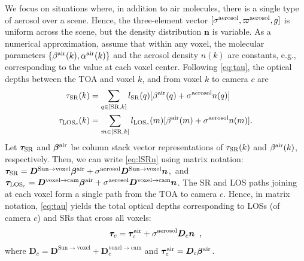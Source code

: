 \documentclass[10pt,letterpaper]{article}
\newcommand{\vect}[1]{\bm{#1}}
\newcommand{\OpDistance}{\bm{D}}
\newcommand{\DistUnknown}{\vect{n}}
\begin{document}
We focus on situations where, in addition to air molecules, there is a
single type of aerosol over a scene. Hence, the three-element vector
$[{\sigma}^{\rm aerosol},\varpi^{\rm aerosol},g]$ is uniform across
the scene, but the density distribution ${\DistUnknown}$ is
variable. As a numerical approximation, assume that within any voxel,
the molecular parameters $\{ \beta^{\rm air}(k),\alpha^{\rm air}(k)\}$
and the aerosol density $n(k)$ are constants, e.g., corresponding to
the value at each voxel center.  Following \cref{eq:tau}, the optical
depths between the TOA and voxel $k$, and from voxel $k$ to camera $c$ are
\begin{align}
  \tau_{\rm SR}(k)&=
  \sum_{q \in[{\rm SR},k]} l_{\rm SR}(q)
  [\beta^{\rm air}(q)+\sigma^{\rm aerosol} n(q)] \\
  \tau_{{\rm LOS}_c}(k)&=
  \sum_{m \in[{\rm SR},k]} l_{{\rm LOS}_c}(m)
  [\beta^{\rm air}(m)+\sigma^{\rm aerosol} n(m)].
  \label{eq:lSRn}
\end{align}
Let $\vect{\tau}_{\rm SR}$ and $\vect{\beta}^{\rm air}$ be 
column stack vector
representations of $\tau_{\rm SR}(k)$ and $\beta^{\rm air}(k)$, respectively.
 Then, we can write \cref{eq:lSRn} using
matrix notation: 
   \mbox{$\vect{\tau}_{\rm SR}=
   \OpDistance^{\mathrm{Sun \rightarrow voxel}}\vect{\beta}^{\rm air} 
   + \sigma^{\rm aerosol}\OpDistance^{\mathrm{Sun \rightarrow voxel}} {\DistUnknown}$},\
and
    \mbox{$\vect{\tau}_{{\rm LOS}_c}=
   \OpDistance^{\mathrm{voxel \rightarrow cam}}\vect{\beta}^{\rm air}
   + \sigma^{\rm aerosol}\OpDistance^{\mathrm{voxel \rightarrow cam}} {\DistUnknown}$}.
The SR and LOS paths joining at each voxel 
form a single path from the TOA to camera $c$.  
Hence, in matrix notation, \cref{eq:tau} yields the total optical
depths corresponding to LOSs (of camera $c$) and SRs that cross all
voxels:
\begin{equation}
  \vect{\tau}_c= \vect{\tau}_c^{\rm air}
  + \sigma^{\rm aerosol} {\bm D}_c {\bm n}
  \;\;,
  \label{eq:tautotal}
\end{equation}
where   ${\bm D}_c=
  {\bm D}^{\mathrm{Sun \rightarrow voxel}}+
  {\bm D}^{\mathrm{voxel \rightarrow cam}}_c$
and $\vect{\tau}_c^{\rm air}= {\bm D}_c \vect{\beta}^{\rm air}$.
  
\end{document}
